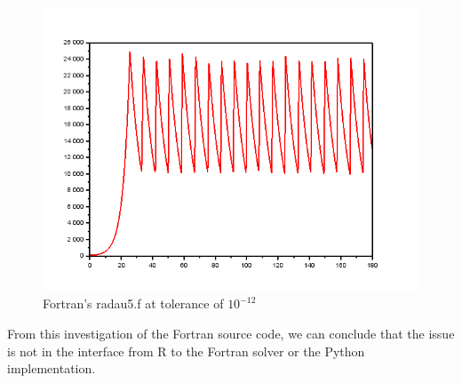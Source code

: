 \begin{figure}[h]
\centering
\includegraphics[width=0.7\linewidth]{./figures/fortran_radau_tol_12}
\caption{Fortran's radau5.f at tolerance of $10^{-12}$}
\label{fig:fortran_radau_tol_12}
\end{figure}

From this investigation of the Fortran source code, we can conclude that the issue is not in the interface from R to the Fortran solver or the Python implementation.

